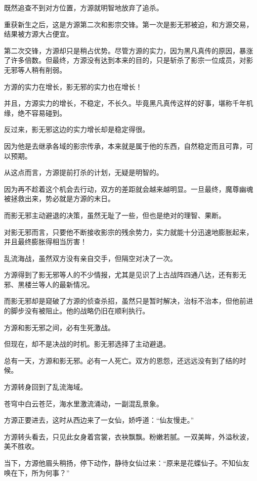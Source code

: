 
\begin{this_body}

既然追查不到对方位置，方源就明智地放弃了追杀。

重获新生之后，这是方源第二次和影宗交锋。第一次是影无邪被迫，和方源交易，结果被方源大占便宜。

第二次交锋，方源却只是稍占优势。尽管方源的实力，因为黑凡真传的原因，暴涨了许多倍数。但最终，方源没有达到本来的目的，只是斩杀了影宗一位成员，对影无邪等人稍有削弱。

方源的实力在增长，影无邪的实力也在增长！

并且，方源实力的增长，不稳定，不长久。毕竟黑凡真传这样的好事，堪称千年机缘，绝不容易碰到。

反过来，影无邪这边的实力增长却是稳定得很。

因为他是去继承各域的影宗传承，本来就是属于他的东西，自然稳定而且可靠，可以预期。

从这点而言，方源提前打杀的计划，无疑是明智的。

因为再不趁着这个机会去行动，双方的差距就会越来越明显。一旦最终，魔尊幽魂被拯救出来，势必就是方源的末日。

而影无邪主动避退的决策，虽然无耻了一些，但也是绝对的理智、果断。

对影无邪而言，只要他不断接收影宗的残余势力，实力就能十分迅速地膨胀起来，并且最终膨胀得相当厉害！

乱流海战，虽然双方没有亲自交手，但隔空对决了一次。

方源得到了影无邪等人的不少情报，尤其是见识了上古战阵四通八达，还有影无邪、黑楼兰等人的最新情况。

而影无邪却是窥破了方源的侦查杀招，虽然只是暂时解决，治标不治本，但他前进的脚步没有被阻止。他的战略仍旧在顺利执行。

方源和影无邪之间，必有生死激战。

但现在，却不是决战的时机。影无邪选择了主动避退。

总有一天，方源和影无邪。必有一人死亡。双方的恩怨，还远远没有到了结的时候。

方源转身回到了乱流海域。

苍穹中白云苍茫，海水里激流涌动，一副混乱景象。

方源正要进去，这时从西边来了一女仙，娇呼道：“仙友慢走。”

方源转头看去，只见此女身着宫裳，衣袂飘飘。粉嫩若腻。一双美眸，外溢秋波，美不胜收。

当下，方源他眉头稍扬，停下动作，静待女仙过来：“原来是花蝶仙子。不知仙友唤在下，所为何事？”


\end{this_body}
